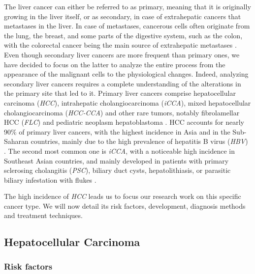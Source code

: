 \documentclass[]{article}
\begin{document}
The liver cancer can either be referred to as primary, meaning that it
is originally growing in the liver itself, or as secondary, in case of
extrahepatic cancers that metastases in the liver.
In case of metastases, cancerous cells often originate from the lung,
the breast, and some parts of the digestive system, such as the colon,
with the colorectal cancer being the main source of extrahepatic
metastases \cite{Hoyer2012a, Sahani2014}.
Even though secondary liver cancers are more frequent than primary ones,
we have decided to focus on the latter to analyze the entire process
from the appearance of the malignant cells to the physiological changes.
Indeed, analyzing secondary liver cancers requires a complete
understanding of the alterations in the primary site that led to it.
Primary liver cancers comprise hepatocellular carcinoma (\emph{HCC}),
intrahepatic cholangiocarcinoma (\emph{iCCA}), mixed hepatocellular
cholangiocarcinoma (\emph{HCC-CCA}) and other rare tumors, notably
fibrolamellar HCC (\emph{FLC}) and pediatric neoplasm hepatoblastoma
\cite{Sia2017, Lozano2012,20113051318}.
HCC accounts for nearly 90\% of primary liver cancers, with the highest
incidence in Asia and in the Sub-Saharan countries, mainly due to the
high prevalence of hepatitis B virus (\emph{HBV}) \cite{Sia2017, Torre2015}. The second most common one is \emph{iCCA}, with a
noticeable high incidence in Southeast Asian countries, and mainly
developed in patients with primary sclerosing cholangitis (\emph{PSC}),
biliary duct cysts, hepatolithiasis, or parasitic biliary infestation
with flukes \cite{Sia2017, Bridgewater2014}.

The high incidence of \emph{HCC} leads us to focus our research work on
this specific cancer type. We will now detail its risk factors,
development, diagnosis methods and treatment techniques.

\subsection*{Hepatocellular Carcinoma}\label{hepatocellular-carcinoma}

\subsubsection*{Risk factors}\label{risk-factors}
\end{document}
